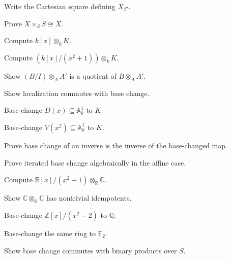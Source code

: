 \begin{exercise}\label{exr:vi24-01}
Write the Cartesian square defining $X_{S'}$.
\end{exercise}
\begin{exercise}\label{exr:vi24-02}
Prove $X\times_SS\cong X$.
\end{exercise}
\begin{exercise}\label{exr:vi24-03}
Compute $k[x]\otimes_kK$.
\end{exercise}
\begin{exercise}\label{exr:vi24-04}
Compute $(k[x]/(x^2+1))\otimes_kK$.
\end{exercise}
\begin{exercise}\label{exr:vi24-05}
Show $(B/I)\otimes_AA'$ is a quotient of $B\otimes_AA'$.
\end{exercise}
\begin{exercise}\label{exr:vi24-06}
Show localization commutes with base change.
\end{exercise}
\begin{exercise}\label{exr:vi24-07}
Base-change $D(x)\subseteq\mathbb A^1_k$ to $K$.
\end{exercise}
\begin{exercise}\label{exr:vi24-08}
Base-change $V(x^2)\subseteq\mathbb A^1_k$ to $K$.
\end{exercise}
\begin{exercise}\label{exr:vi24-09}
Prove base change of an inverse is the inverse of the base-changed map.
\end{exercise}
\begin{exercise}\label{exr:vi24-10}
Prove iterated base change algebraically in the affine case.
\end{exercise}
\begin{exercise}\label{exr:vi24-11}
Compute $\mathbb R[x]/(x^2+1)\otimes_{\mathbb R}\mathbb C$.
\end{exercise}
\begin{exercise}\label{exr:vi24-12}
Show $\mathbb C\otimes_{\mathbb R}\mathbb C$ has nontrivial idempotents.
\end{exercise}
\begin{exercise}\label{exr:vi24-13}
Base-change $\mathbb Z[x]/(x^2-2)$ to $\mathbb Q$.
\end{exercise}
\begin{exercise}\label{exr:vi24-14}
Base-change the same ring to $\mathbb F_2$.
\end{exercise}
\begin{exercise}\label{exr:vi24-15}
Show base change commutes with binary products over $S$.
\end{exercise}
